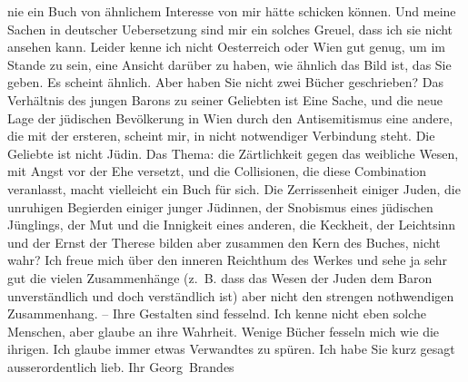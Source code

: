 \begin{ledgroupsized}[t]{13cm}
               nie ein Buch von ähnlichem Interesse von mir hätte schicken können. Und meine Sachen
               in deutscher Uebersetzung sind mir ein solches Greuel, dass ich sie nicht ansehen
               kann.\pend
           \pstart
           Leider kenne ich nicht Oesterreich oder Wien gut genug, um im Stande zu sein, eine Ansicht
               darüber zu haben, wie ähnlich das Bild ist, das Sie geben. Es scheint ähnlich. Aber
               haben Sie nicht zwei Bücher geschrieben? Das Verhältnis des jungen Barons zu seiner Geliebten ist Eine Sache,
               und die {\pb}neue Lage der jüdischen
               Bevölkerung in Wien durch den Antisemitismus eine
               andere, die mit der ersteren, scheint mir, in nicht notwendiger Verbindung steht. Die
               Geliebte ist nicht Jüdin.\pend
           \pstart
           Das Thema: die Zärtlichkeit gegen das weibliche Wesen, mit Angst vor der Ehe
               versetzt, und die Collisionen, die diese Combination veranlasst,  macht vielleicht ein Buch für sich. Die
               Zerrissenheit einiger Juden, die unruhigen Begierden einiger junger Jüdinnen, der
               Snobismus eines jüdischen Jünglings, der {\pb}Mut und die Innigkeit eines
               anderen, die Keckheit, der Leichtsinn und der Ernst der Therese bilden aber zusammen den Kern des
               Buches, nicht wahr? Ich freue mich über den inneren Reichthum des Werkes und sehe ja
               sehr gut die vielen Zusammenhänge (z. B. dass das Wesen der Juden dem Baron
               unverständlich und doch verständlich ist) aber nicht den strengen nothwendigen
               Zusammenhang. – Ihre Gestalten sind fesselnd. Ich kenne nicht eben solche Menschen,
               aber glaube an ihre Wahrheit.\pend
           \pstart
           Wenige Bücher fesseln mich wie die ihrigen. Ich glaube immer etwas Verwandtes zu
               spüren.\pend
           \pstart
           Ich habe Sie kurz gesagt ausserordentlich lieb.\pend
           \pstart Ihr \spacefill\mbox{Georg Brandes}\pend{}
         
         \endnumbering{}\end{ledgroupsized}  \newcommand{\dateiname}{L01777}\newcommand{\titel}{Georg Brandes an Arthur Schnitzler, [25. 6. 1908]}\newcommand{\editorInnen}{Martin Anton Müller und Gerd-Hermann Susen}
      